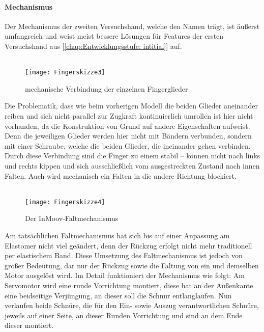 \documentclass[titlepage,12pt,twoside]{article}
\begin{document}
\paragraph{Mechanismus}
\label{par:Mechanismus_zweite_Hand}
\hfill \break
\hfill \break
Der Mechanismus der zweiten Versuchshand, welche den Namen  trägt,  ist äußerst umfangreich und weist meist bessere Lösungen für Features der ersten Versuchshand aus [\textcolor{blue}{\autoref{chap:Entwicklungsstufe: intitial}}] auf. \\
\\
\begin{figure}[H]
	\begin{center}
		\scalebox{1}
		{\texttt{[image: Fingerskizze3]}}
		\caption{mechanische Verbindung der einzelnen Fingerglieder}
		\label{fig:Fingerskizze3}			
	\end{center}
\end{figure}
\hfill \break
Die Problematik, dass wie beim vorherigen Modell die beiden Glieder aneinander reiben und sich nicht parallel zur Zugkraft kontinuierlich umrollen ist hier nicht vorhanden, da die Konstruktion von Grund auf andere Eigenschaften aufweist. 
Denn die jeweiligen Glieder werden hier nicht mit Bändern verbunden, sondern mit einer Schraube, welche die beiden Glieder, die ineinander gehen verbinden. Durch diese Verbindung sind die Finger zu einem stabil – können nicht nach links und 
rechts kippen und sich ausschließlich vom ausgestreckten Zustand nach innen Falten. Auch wird mechanisch ein Falten in die andere Richtung blockiert. \\
\\
\begin{figure}[H]
	\begin{center}
		\scalebox{1.1}
		{\texttt{[image: Fingerskizze4]}}
		\caption{Der InMoov-Faltmechanismus}
		\label{fig:Fingerskizze4}			
	\end{center}
\end{figure}
\hfill \break
Am tatsächlichen Faltmechanismus hat sich bis auf einer Anpassung am Elastomer nicht viel geändert, denn der Rückzug erfolgt nicht mehr traditionell per elastischem Band. Diese Umsetzung des Faltmechanismus ist jedoch von großer Bedeutung, dar 
nur der Rückzug sowie die Faltung von ein und demselben Motor ausgelöst wird. Im Detail funktioniert der Mechanismus wie folgt: Am Servomotor wird eine runde Vorrichtung montiert, diese hat an der Außenkante 
eine beidseitige Verjüngung, an dieser soll die Schnur entlanglaufen. Nun verlaufen beide Schnüre, die für den Ein- sowie Auszug verantwortlichen Schnüre, jeweils auf einer Seite, an dieser Runden Vorrichtung und sind an dem Ende dieser montiert. 
\end{document}
